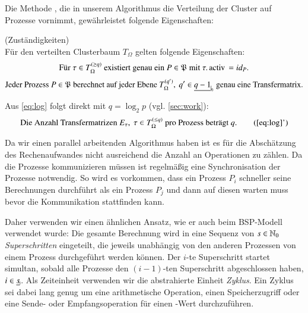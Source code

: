  Die Methode , die in unserem Algorithmus die Verteilung der Cluster auf Prozesse vornimmt, gewährleistet folgende Eigenschaften:
  
  \begin{bem}
    (Zuständigkeiten)\\
    Für den verteilten Clusterbaum $T_\Omega$ gelten folgende Eigenschaften:
    \begin{equation}
      \text{Für } \tau \in T_\Omega^{(\geq q)} \text{ existiert genau ein } P \in \Proc \text{ mit } \tau.\tcode{activ} = id_P.
    \end{equation}
    \begin{equation}
      \text{Jeder Prozess } P \in \Proc \text{ berechnet auf jeder Ebene } T_\Omega^{(q')}, \ q' \in \nullhaken{q-1} \text{ genau eine Transfermatrix.}\label{eq:log}
    \end{equation}

    Aus \autoref{eq:log} folgt direkt mit $q = \log_2 p$ (vgl. \autoref{sec:work}):
    \begin{equation}
      \text{Die Anzahl Transfermatrizen } E_\tau, \ \tau \in T_\Omega^{(\leq q)} \text{ pro Prozess beträgt } q.\tag{\ref{eq:log}'}
    \end{equation}
  \end{bem}

  Da wir einen parallel arbeitenden Algorithmus haben ist es für die Abschätzung des Rechenaufwandes nicht ausreichend die Anzahl an Operationen zu zählen. Da die Prozesse kommunizieren müssen ist 
  regelmäßig eine Synchronisation der Prozesse notwendig. So wird es vorkommen, dass ein Prozess $P_i$ schneller seine Berechnungen durchführt als ein Prozess $P_j$ und dann auf diesen warten muss bevor
  die Kommunikation stattfinden kann. 
  
  Daher verwenden wir einen ähnlichen Ansatz, wie er auch beim BSP-Modell \citep{bsp} verwendet wurde: Die gesamte Berechnung wird in eine Sequenz von $s \in \mathbb{N}_0$ \textit{Superschritten} eingeteilt,
  die jeweils unabhängig von den anderen Prozessen von einem Prozess durchgeführt werden können. Der $i$-te Superschritt startet simultan, sobald alle Prozesse den $(i-1)$-ten Superschritt abgeschlossen
  haben, $i \in \haken{s}$. Als Zeiteinheit verwenden wir die abstrahierte Einheit \textit{Zyklus}. Ein Zyklus sei dabei lang genug um eine arithmetische Operation, einen Speicherzugriff oder eine Sende-
  oder Empfangsoperation für einen -Wert durchzuführen.
  
